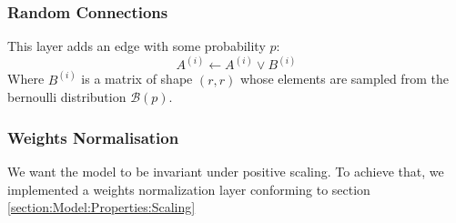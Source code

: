 \subsubsection{Random Connections}
This layer adds an edge with some probability $p:$
\begin{equation*}
	A^{(i)}\leftarrow A^{(i)} \vee B^{(i)}
\end{equation*}
Where $B^{(i)}$ is a matrix of shape $(r,r)$ whose elements are sampled from the bernoulli distribution $\mathcal{B}(p)$.
\subsubsection{Weights Normalisation}
We want the model to be invariant under positive scaling. To achieve that, we implemented a weights normalization layer conforming to section \ref{section:Model:Properties:Scaling}
